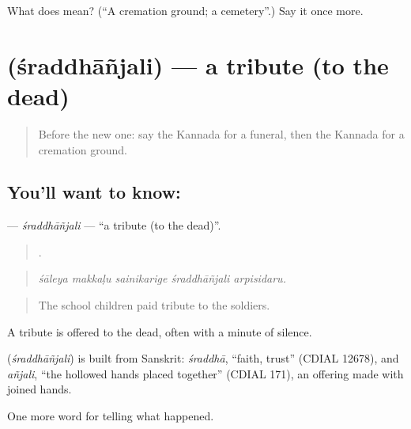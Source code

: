 \begin{tcolorbox}[breakable,colback=teal!4,colframe=teal!35!black,title={Before you move on}]
What does  mean? (\textquotedblleft{}A cremation ground; a cemetery\textquotedblright{}.) Say it once more.
\end{tcolorbox}
\section[\texorpdfstring{\kn{ಶ್ರದ್ಧಾಂಜಲಿ} (śraddhāñjali)}{ಶ್ರದ್ಧಾಂಜಲಿ (śraddhāñjali)}]{ (śraddhāñjali) — a tribute (to the dead)}

\label{lesson:KA-C337-sraddhanjali}



\begin{quote}
Before the new one: say the Kannada for a funeral, then the Kannada for a cremation ground.
\end{quote}

\subsection*{You'll want to know: }
\textbf{} — \emph{śraddhāñjali} — \textquotedblleft{}a tribute (to the dead)\textquotedblright{}.

\begin{quote}
    .
\end{quote}

\begin{quote}
\emph{śāleya makkaḷu sainikarige śraddhāñjali arpisidaru.}
\end{quote}

\begin{quote}
The school children paid tribute to the soldiers.
\end{quote}

A tribute is offered to the dead, often with a minute of silence.

\begin{cousinweb}
\textbf{} (\emph{śraddhāñjali}) is built from Sanskrit: \emph{śraddhā}, \textquotedblleft{}faith, trust\textquotedblright{} (CDIAL 12678), and \emph{añjali}, \textquotedblleft{}the hollowed hands placed together\textquotedblright{} (CDIAL 171), an offering made with joined hands.
\end{cousinweb}

\begin{grammarlens}[title={What you've built}]
One more word for telling what happened.
\end{grammarlens}

